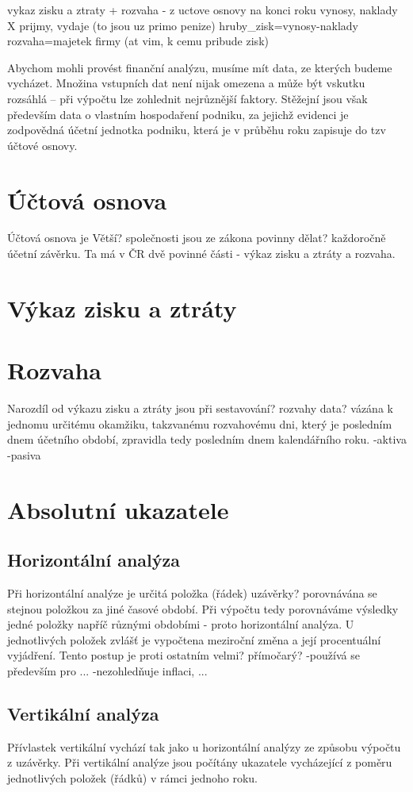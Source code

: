 vykaz zisku a ztraty + rozvaha - z uctove osnovy na konci roku
vynosy, naklady X prijmy, vydaje (to jsou uz primo penize)
hruby\_zisk=vynosy-naklady
rozvaha=majetek firmy (at vim, k cemu pribude zisk)

Abychom mohli provést finanční analýzu, musíme mít data, ze kterých budeme vycházet. Množina vstupních dat není nijak omezena a může být vskutku rozsáhlá -- při výpočtu lze zohlednit nejrůznější faktory. Stěžejní jsou však především data o vlastním hospodaření podniku, za jejichž evidenci je zodpovědná účetní jednotka podniku, která je v průběhu roku zapisuje do tzv účtové osnovy.
\section{Účtová osnova}
Účtová osnova je 
Větší? společnosti jsou ze zákona povinny dělat? každoročně účetní závěrku. Ta má v ČR dvě povinné části - výkaz zisku a ztráty a rozvaha. 
\section{Výkaz zisku a ztráty}
\section{Rozvaha}
Narozdíl od výkazu zisku a ztráty jsou při sestavování? rozvahy data? vázána k jednomu určitému okamžiku, takzvanému rozvahovému dni, který je posledním dnem účetního období, zpravidla tedy posledním dnem kalendářního roku.
-aktiva
-pasiva

\section{Absolutní ukazatele}

\subsection{Horizontální analýza}
Při horizontální analýze je určitá položka (řádek) uzávěrky? porovnávána se stejnou položkou za jiné časové období. Při výpočtu tedy porovnáváme výsledky jedné položky napříč různými obdobími - proto horizontální analýza. U jednotlivých položek zvlášť je vypočtena meziroční změna a její procentuální vyjádření. Tento postup je proti ostatním velmi? přímočarý?
-používá se především pro ...
-nezohledňuje inflaci, ...

\subsection{Vertikální analýza}
Přívlastek vertikální vychází tak jako u horizontální analýzy ze způsobu výpočtu z uzávěrky. Při vertikální analýze jsou počítány ukazatele vycházející z poměru jednotlivých položek (řádků) v rámci jednoho roku.

